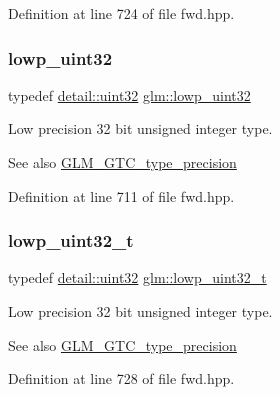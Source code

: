 Definition at line 724 of file fwd.\+hpp.

\mbox{\label{group__gtc__type__precision_gaf11e85af414720b4cd12bd57b3a81e68}} 
\subsubsection{\texorpdfstring{lowp\_uint32}{lowp\_uint32}}
{\footnotesize\ttfamily typedef \mbox{\hyperlink{namespaceglm_1_1detail_ade6cfbf377022aaa391af8cd50489222}{detail\+::uint32}} \mbox{\hyperlink{group__gtc__type__precision_gaf11e85af414720b4cd12bd57b3a81e68}{glm\+::lowp\+\_\+uint32}}}

Low precision 32 bit unsigned integer type. \begin{DoxySeeAlso}{See also}
\mbox{\hyperlink{group__gtc__type__precision}{G\+L\+M\+\_\+\+G\+T\+C\+\_\+type\+\_\+precision}} 
\end{DoxySeeAlso}


Definition at line 711 of file fwd.\+hpp.

\mbox{\label{group__gtc__type__precision_ga9f8cb602a358e1f48bda2682cf051f0c}} 
\subsubsection{\texorpdfstring{lowp\_uint32\_t}{lowp\_uint32\_t}}
{\footnotesize\ttfamily typedef \mbox{\hyperlink{namespaceglm_1_1detail_ade6cfbf377022aaa391af8cd50489222}{detail\+::uint32}} \mbox{\hyperlink{group__gtc__type__precision_ga9f8cb602a358e1f48bda2682cf051f0c}{glm\+::lowp\+\_\+uint32\+\_\+t}}}

Low precision 32 bit unsigned integer type. \begin{DoxySeeAlso}{See also}
\mbox{\hyperlink{group__gtc__type__precision}{G\+L\+M\+\_\+\+G\+T\+C\+\_\+type\+\_\+precision}} 
\end{DoxySeeAlso}


Definition at line 728 of file fwd.\+hpp.

\mbox{\label{group__gtc__type__precision_gacf666a9d9b309c4615c7a4f2ab0be289}} 
